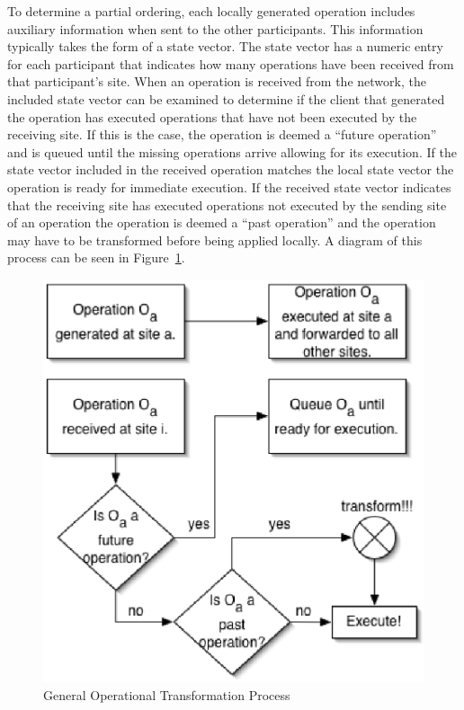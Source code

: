\documentclass{article}
\begin{document}
To determine a partial ordering, each locally generated operation
includes auxiliary information when sent to the other participants.
This information typically takes the form of a state vector.  The
state vector has a numeric entry for each participant that indicates
how many operations have been received from that participant's site.
When an operation is received from the network, the included state
vector can be examined to determine if the client that generated the
operation has executed operations that have not been executed by the
receiving site.  If this is the case, the operation is deemed a
``future operation'' and is queued until the missing operations arrive
allowing for its execution.  If the state vector included in the
received operation matches the local state vector the operation is
ready for immediate execution.  If the received state vector indicates
that the receiving site has executed operations not executed by the
sending site of an operation the operation is deemed a ``past
operation'' and the operation may have to be transformed before being
applied locally.  A diagram of this process can be seen in
Figure~\ref{flow}.

\begin{figure}[!h]
\begin{center}
\includegraphics{flow.eps}
\caption{General Operational Transformation Process} \label{flow}
\end{center}
\end{figure}
\end{document}
